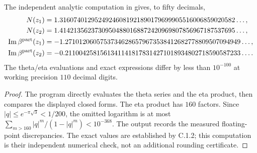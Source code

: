 \begin{statement}
The independent analytic computation in
 gives, to fifty decimals,
\begin{align*}
 N(z_1)&=1.31607401295249246081921890179699905516006859020582\ldots,\\
 N(z_2)&=1.41421356237309504880168872420969807856967187537695\ldots,\\
 \operatorname{Im}\beta^{\rm part}(z_1)
  &=-1.27101206057537346286579673538412682778809507094949\ldots,\\
 \operatorname{Im}\beta^{\rm part}(z_2)
  &=-0.21100425815613411418178314271018934802718590587233\ldots.
\end{align*}
The theta/eta evaluations and exact expressions differ by less than
$10^{-100}$ at working precision $110$ decimal digits.
\end{statement}
\begin{proof}
The program directly evaluates the theta series and the eta product,
then compares the displayed closed forms. The eta product has $160$
factors. Since $|q|\le e^{-\pi\sqrt3}<1/200$, the omitted logarithm is
at most $\sum_{m>160}|q|^m/(1-|q|^m)<10^{-368}$.
The output records the measured floating-point discrepancies. The
exact values are established by C.1.2; this computation is their
independent numerical check, not an additional rounding certificate.
\end{proof}


